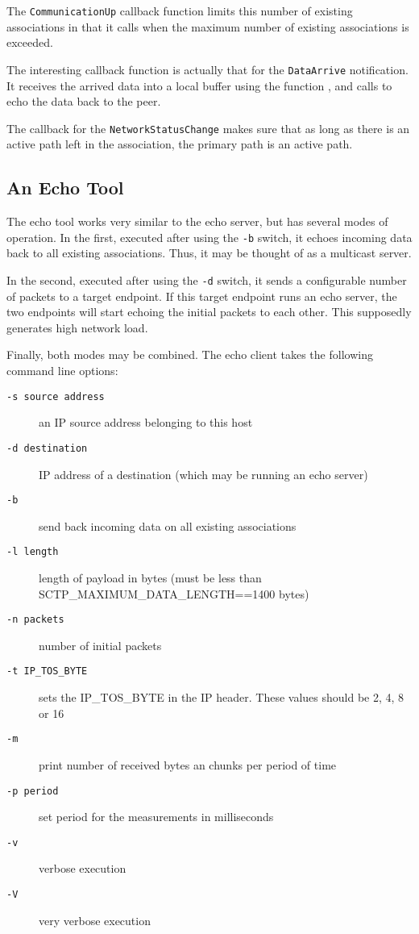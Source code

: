 \documentclass[10pt]{article}
\newcommand{\pp}{\vspace{0,5cm} \noindent }
\begin{document}
\pp
The \texttt{CommunicationUp} callback function limits this number of
existing associations in that it calls  when the
maximum number of existing associations is exceeded.

The interesting callback function is actually that for the \texttt{DataArrive}
notification. It receives the arrived data into a local buffer using the function
, and calls  to echo the data
back to the peer.

The callback for the \texttt{NetworkStatusChange} makes sure that as long as there
is an active path left in the association, the primary path is an active
path.

\subsection{An Echo Tool}
\label{echo2}
The echo tool works very  similar to the echo server, but has several modes
of operation. In the first, executed after using the \texttt{-b} switch, it
echoes incoming data back to all existing associations. 
Thus, it may be thought of as a multicast server.

In the second, executed after using the \texttt{-d} switch, it sends 
a configurable number of packets to a target endpoint. If this target
endpoint runs an echo server, the two endpoints will start echoing the
initial packets to each other. This supposedly generates high network load.

Finally, both modes may be combined.
The echo client takes the following command line options:
\begin{description}
\item[\texttt{-s source address}] an IP source address belonging to this host
\item[\texttt{-d destination}] IP address of a destination (which may be
    running an echo server)
\item[\texttt{-b}] send back incoming data on all existing associations
\item[\texttt{-l length}] length of payload in bytes (must be less than
    SCTP_MAXIMUM_DATA_LENGTH==1400 bytes)
\item[\texttt{-n packets}] number of initial packets
\item[\texttt{-t IP_TOS_BYTE}] sets the IP_TOS_BYTE in the IP header. These values
    should be 2, 4, 8 or 16
\item[\texttt{-m}] print number of received bytes an chunks per period of time
\item[\texttt{-p period}] set period for the measurements in milliseconds
\item[\texttt{-v}] verbose execution
\item[\texttt{-V}] very verbose execution
\end{description}
\end{document}
